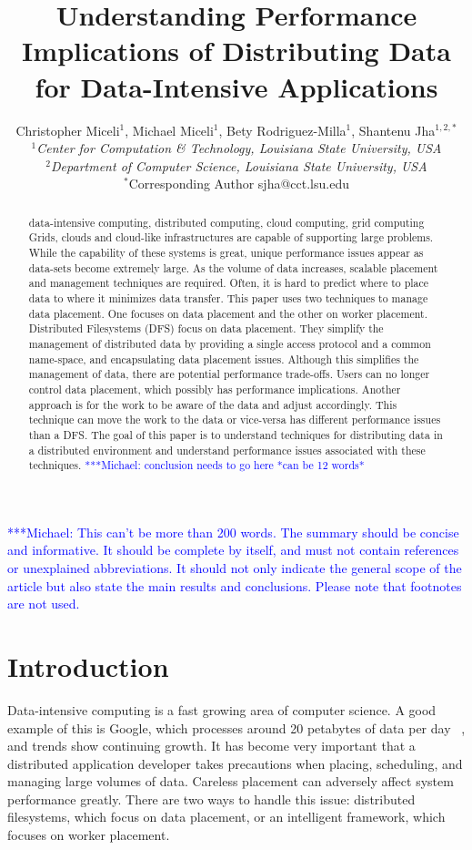 \documentclass{rspublic}
\title[Understanding Performance Implications of Distributing Data for
Data-Intensive Applications]{Understanding Performance Implications of
Distributing Data for Data-Intensive Applications}
\author[Miceli, Miceli, Rodriguez-Milla, Jha]{ Christopher Miceli$^{1}$,
Michael Miceli$^{1}$, Bety Rodriguez-Milla$^{1}$, Shantenu Jha$^{1,2,*}$ \\
\small{\emph{$^{1}$Center for Computation \& Technology, Louisiana State
University, USA}} \\  \small{\emph{$^{2}$Department of Computer Science,
Louisiana State University, USA}} \\ {\footnotesize {\hspace{0.0 in}
$^*$Corresponding Author sjha@cct.lsu.edu}} }
\newcommand{\micnote}[1]{ {\textcolor{blue} { ***Michael: #1 }}} \else
\begin{document}
 \maketitle

\micnote{This can't be more than 200 words.  The summary should be concise and
informative.  It should be complete by itself, and must not contain references
or unexplained abbreviations.  It should not only indicate the general scope of
the article but also state the main results and conclusions.  Please note that
footnotes are not used.}

\begin{abstract}{data-intensive computing, distributed computing, cloud
computing, grid computing} Grids, clouds and cloud-like infrastructures
are capable of supporting large problems.  While the capability of these
systems is great, unique performance issues appear as data-sets become
extremely large.  As the volume of data increases, scalable placement
and management techniques are required.  Often, it is hard to predict
where to place data to where it minimizes data transfer.  This paper
uses two techniques to manage data placement.  One focuses on data
placement and the other on worker placement.  Distributed Filesystems
(DFS) focus on data placement.  They simplify the management of
distributed data by providing a single access protocol and a common
name-space, and encapsulating data placement issues.  Although this
simplifies the management of data, there are potential performance
trade-offs.  Users can no longer control data placement, which possibly
has performance implications.  Another approach is for the work to be
aware of the data and adjust accordingly. This technique can move the
work to the data or vice-versa has different performance issues than a
DFS.  The goal of this paper is to understand techniques for
distributing data in a distributed environment and understand
performance issues associated with these techniques.\micnote{conclusion
needs to go here *can be 12 words*}\end{abstract}

\section{Introduction} Data-intensive computing is a fast growing area
of computer science.  A good example of this is Google, which processes
around 20 petabytes of data per day ~\citep{google}, and trends show
continuing growth.  It has become very important that a distributed
application developer takes precautions when placing, scheduling, and
managing large volumes of data.  Careless placement can adversely affect
system performance greatly.  There are two ways to handle this issue:
distributed filesystems, which focus on data placement, or an
intelligent framework, which focuses on worker placement.
\end{document}
